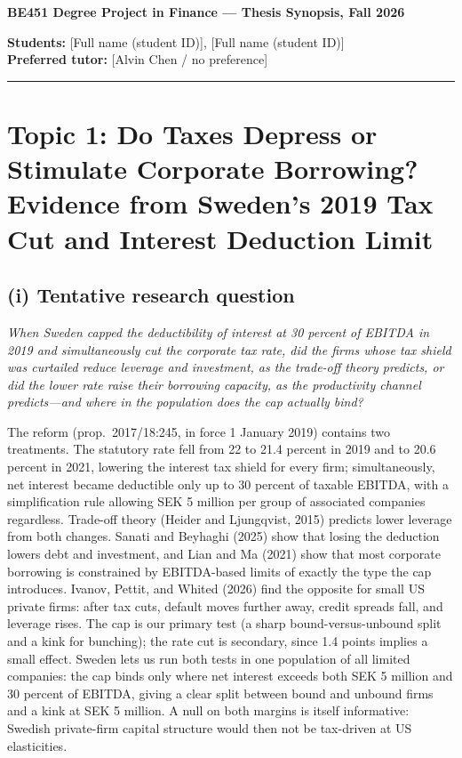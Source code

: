 \documentclass[12pt,a4paper]{article}
\begin{document}
{\large\bfseries BE451 Degree Project in Finance --- Thesis Synopsis, Fall 2026}

\textbf{Students:} [Full name (student ID)], [Full name (student ID)] \\
\textbf{Preferred tutor:} [Alvin Chen / no preference]

\vspace{4pt}\hrule\vspace{4pt}

\section{Topic 1: Do Taxes Depress or Stimulate Corporate Borrowing? Evidence from Sweden's 2019 Tax Cut and Interest Deduction Limit}

\subsection{(i) Tentative research question}

\emph{When Sweden capped the deductibility of interest at 30 percent of EBITDA in 2019 and simultaneously cut the corporate tax rate, did the firms whose tax shield was curtailed reduce leverage and investment, as the trade-off theory predicts, or did the lower rate raise their borrowing capacity, as the productivity channel predicts---and where in the population does the cap actually bind?}

The reform (prop.\ 2017/18:245, in force 1 January 2019) contains two treatments. The statutory rate fell from 22 to 21.4 percent in 2019 and to 20.6 percent in 2021, lowering the interest tax shield for every firm; simultaneously, net interest became deductible only up to 30 percent of taxable EBITDA, with a simplification rule allowing SEK 5 million per group of associated companies regardless. Trade-off theory (Heider and Ljungqvist, 2015) predicts lower leverage from both changes. Sanati and Beyhaghi (2025) show that losing the deduction lowers debt and investment, and Lian and Ma (2021) show that most corporate borrowing is constrained by EBITDA-based limits of exactly the type the cap introduces. Ivanov, Pettit, and Whited (2026) find the opposite for small US private firms: after tax cuts, default moves further away, credit spreads fall, and leverage rises. The cap is our primary test (a sharp bound-versus-unbound split and a kink for bunching); the rate cut is secondary, since 1.4 points implies a small effect. Sweden lets us run both tests in one population of all limited companies: the cap binds only where net interest exceeds both SEK 5 million and 30 percent of EBITDA, giving a clear split between bound and unbound firms and a kink at SEK 5 million. A null on both margins is itself informative: Swedish private-firm capital structure would then not be tax-driven at US elasticities.
\end{document}
